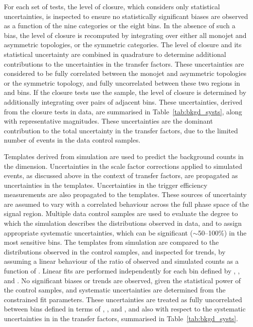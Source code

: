 For each set of tests, the level of closure, which considers only
statistical uncertainties, is inspected to ensure no statistically
significant biases are observed as a function of the nine \njet
categories or the eight \scalht bins. In the absence of such a bias,
the level of closure is recomputed by integrating over either all
monojet and asymmetric topologies, or the symmetric \njet
categories. The level of closure and its statistical uncertainty are
combined in quadrature to determine additional contributions to the
uncertainties in the transfer factors. These uncertainties are
considered to be fully correlated between the monojet and asymmetric
topologies or the symmetric topology, and fully uncorrelated between
these two regions in \njet and \scalht bins. If the closure tests use
the \mmj sample, the level of closure is determined by additionally
integrating over pairs of adjacent \scalht bins. These uncertainties,
derived from the closure tests in data, are summarised in
Table~\ref{tab:bkgd_systs}, along with representative
magnitudes. These uncertainties are the dominant contribution to the
total uncertainty in the transfer factors, due to the limited number
of events in the data control samples.

Templates derived from simulation are used to predict the background
counts in the \mht dimension. Uncertainties in the scale factor
corrections applied to simulated events, as discussed above in the
context of transfer factors, are propagated as uncertainties in the
\HTmiss templates. Uncertainties in the trigger efficiency
measurements are also propagated to the \HTmiss templates. These
sources of uncertainty are assumed to vary with a correlated behaviour
across the full phase space of the signal region. Multiple data
control samples are used to evaluate the degree to which the
simulation describes the \mht distributions observed in data, and to
assign appropriate systematic uncertainties, which can be significant
($\sim$50--100\%) in the most sensitive \mht bins.  The \mht templates
from simulation are compared to the distributions observed in the
control samples, and inspected for trends, by assuming a linear
behaviour of the ratio of observed and simulated counts as a function
of \HTmiss. Linear fits are performed independently for each bin
defined by \njet, \nb, and \scalht. No significant biases or trends
are observed, given the statistical power of the control samples, and
systematic uncertainties are determined from the constrained fit
parameters. These uncertainties are treated as fully uncorrelated
between bins defined in terms of \njet, \nb, and \scalht, and also
with respect to the systematic uncertainties in in the transfer
factors, summarised in Table~\ref{tab:bkgd_systs}.

